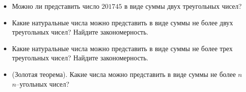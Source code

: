 ﻿

\begin{itemize}
\item Можно ли представить число $201745$ в виде суммы двух треугольных чисел?
\item Какие натуральные числа можно представить в виде суммы не более двух треугольных чисел? Найдите закономерность.
\item Какие натуральные числа можно представить в виде суммы не более трех треугольных чисел? Найдите закономерность.
\item (Золотая теорема). Какие числа можно представить в виде суммы не более $n$ $n$--угольных чисел?

\end{itemize}